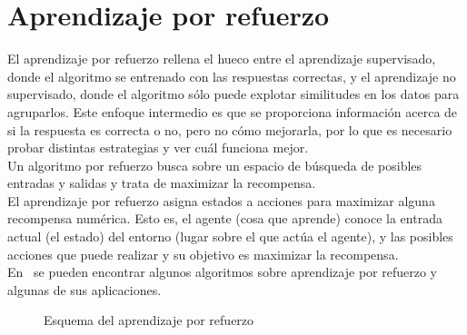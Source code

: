 \section{Aprendizaje por refuerzo}
El aprendizaje por refuerzo rellena el hueco entre el aprendizaje supervisado, donde el algoritmo se entrenado con las respuestas correctas, y el aprendizaje no supervisado, donde el algoritmo sólo puede explotar similitudes en los datos para agruparlos. Este enfoque intermedio es que se proporciona información acerca de si la respuesta es correcta o no, pero no cómo mejorarla, por lo que es necesario probar distintas estrategias y ver cuál funciona mejor.\\

Un algoritmo por refuerzo busca sobre un espacio de búsqueda de posibles entradas y salidas y trata de maximizar la recompensa.\\

El aprendizaje por refuerzo asigna estados a acciones para maximizar alguna recompensa numérica. Esto es, el agente (cosa que aprende) conoce la entrada actual (el estado) del entorno (lugar sobre el que actúa el agente), y las posibles acciones que puede realizar y su objetivo es maximizar la recompensa.\\

En~\cite{Sutton:1998:IRL:551283, Marsland:2009:MLA:1571643} se pueden encontrar algunos algoritmos sobre aprendizaje por refuerzo y algunas de sus aplicaciones.\\


\begin{figure}[htbp!]
	\label{fig:aprendizajerefuerzo}
	\begin{center}
		\resizebox{10cm}{!}{%
			\aprendizajerefuerzo
		}
	\end{center}
	\caption{Esquema del aprendizaje por refuerzo}
\end{figure}
